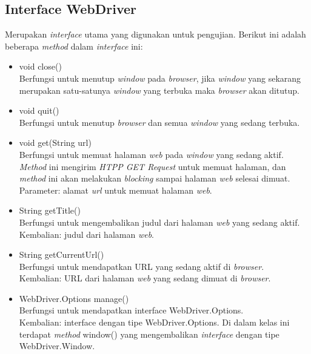 \subsection{Interface WebDriver}
\label{subsec:webdriver}
Merupakan \textit{interface} utama yang digunakan untuk pengujian. Berikut ini adalah beberapa \textit{method} dalam \textit{interface} ini:
\begin{itemize}
\item void close()\\
Berfungsi untuk menutup \textit{window} pada \textit{browser}, jika \textit{window} yang sekarang merupakan satu-satunya \textit{window} yang terbuka maka \textit{browser} akan ditutup.
\item void quit()\\
Berfungsi untuk menutup \textit{browser} dan semua \textit{window} yang sedang terbuka.
\item void get(String url)\\
Berfungsi untuk memuat halaman \textit{web} pada \textit{window} yang sedang aktif. \textit{Method} ini mengirim \textit{HTPP GET Request} untuk memuat halaman, dan \textit{method} ini akan melakukan \textit{blocking} sampai halaman \textit{web} selesai dimuat.\\
Parameter: alamat \textit{url} untuk memuat halaman \textit{web}.
\item String getTitle()\\
Berfungsi untuk mengembalikan judul dari halaman \textit{web} yang sedang aktif.\\
Kembalian: judul dari halaman \textit{web}.
\item String getCurrentUrl()\\
Berfungsi untuk mendapatkan URL yang sedang aktif di \textit{browser}.\\
Kembalian: URL dari halaman \textit{web} yang sedang dimuat di \textit{browser}.

\item WebDriver.Options manage()\\
Berfungsi untuk mendapatkan interface WebDriver.Options.\\
Kembalian: interface dengan tipe WebDriver.Options. Di dalam kelas ini terdapat \textit{method} window() yang mengembalikan \textit{interface} dengan tipe WebDriver.Window. 
\end{itemize}


